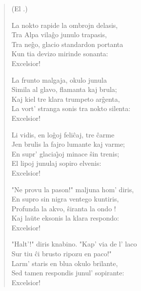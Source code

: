\begin{verse}
\begin{center}
\footnotesize (El .)
\end{center}

            La nokto rapide la ombrojn delasis,\\
            Tra Alpa vila\^go junulo trapasis,\\
            Tra ne\^go, glacio standardon portanta\\
            Kun tia devizo mirinde sonanta:\\
                \hspace*{3.5cm}                    Excelsior!

            La frunto malgaja, okulo junula\\
            Simila al glavo, flamanta kaj brula;\\
            Kaj kiel tre klara trumpeto ar\^genta,\\
            La vort' stranga sonis tra nokto silenta:\\
                   \hspace*{3.5cm}                 Excelsior!

            Li vidis, en lo\^goj feli\^caj, tre \^carme\\
            Jen brulis la fajro lumante kaj varme;\\
            En supr' glacia\^{\j}oj minace \^sin trenis;\\
            El lipoj junulaj sopiro elvenis:\\
                   \hspace*{3.5cm}                 Excelsior!

            "Ne provu la pason!" maljuna hom' diris,\\
            En supro sin nigra ventego kuntiris,\\
            Profunda la akvo, \^siranta la ondo !\\
            Kaj la\u ute eksonis la klara respondo:\\
                    \hspace*{3.5cm}                Excelsior!

            "Halt'!" diris knabino. "Kap' via de l' laco\\
            Sur tiu \^ci brusto ripozu en paco!"\\
            Larm' staris en blua okulo brilante,\\
            Sed tamen respondis junul' sopirante:\\
                   \hspace*{3.5cm}                 Excelsior!


\end{verse}
